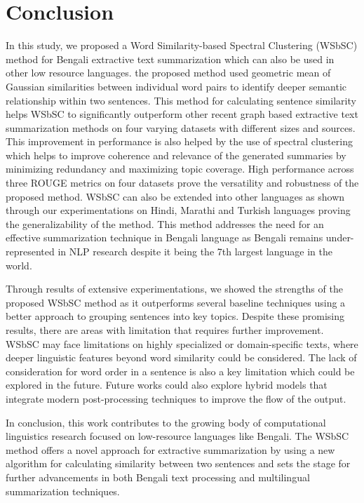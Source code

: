 \documentclass[acmlarge]{acmart}
\begin{document}
\section{Conclusion}\label{sec:conclusion}
In this study, we proposed a Word Similarity-based Spectral Clustering (WSbSC) method for Bengali extractive text summarization which can also be used in other low resource languages. the proposed method used geometric mean of Gaussian similarities between individual word pairs to identify deeper semantic relationship within two sentences. This method for calculating sentence similarity helps WSbSC to significantly outperform other recent graph based extractive text summarization methods on four varying datasets with different sizes and sources. This improvement in performance is also helped by the use of spectral clustering which helps to improve coherence and relevance of the generated summaries by minimizing redundancy and maximizing topic coverage. High performance across three ROUGE metrics on four datasets prove the versatility and robustness of the proposed method. WSbSC can also be extended into other languages as shown through our experimentations on Hindi, Marathi and Turkish languages proving the generalizability of the method. This method addresses the need for an effective summarization technique in Bengali language as Bengali remains under-represented in NLP research despite it being the 7th largest language in the world.

Through results of extensive experimentations, we showed the strengths of the proposed WSbSC method as it outperforms several baseline techniques using a better approach to grouping sentences into key topics. Despite these promising results, there are areas with limitation that requires further improvement. WSbSC may face limitations on highly specialized or domain-specific texts, where deeper linguistic features beyond word similarity could be considered. The lack of consideration for word order in a sentence is also a key limitation which could be explored in the future. Future works could also explore hybrid models that integrate modern post-processing techniques to improve the flow of the output.

In conclusion, this work contributes to the growing body of computational linguistics research focused on low-resource languages like Bengali. The WSbSC method offers a novel approach for extractive summarization by using a new algorithm for calculating similarity between two sentences and sets the stage for further advancements in both Bengali text processing and multilingual summarization techniques.




\appendix
\end{document}
